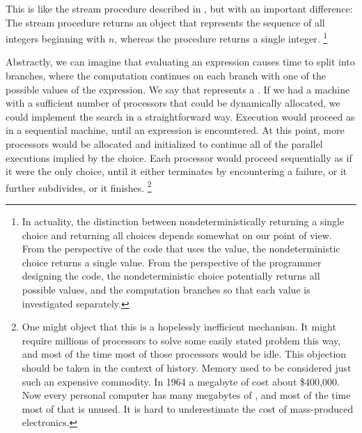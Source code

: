 This is like the stream procedure  described in , but with an important difference:
The stream procedure returns an object that represents the sequence of all integers beginning with \( n \), whereas the  procedure returns a single integer.%
\footnote{
	In actuality, the distinction between nondeterministically returning a single choice and returning all choices depends somewhat on our point of view.
	From the perspective of the code that uses the value, the nondeterministic choice returns a single value.
	From the perspective of the programmer designing the code, the nondeterministic choice potentially returns all possible values, and the computation branches so that each value is investigated separately.
}

Abstractly, we can imagine that evaluating an  expression causes time to split into branches, where the computation continues on each branch with one of the possible values of the expression.
We say that  represents a .
If we had a machine with a sufficient number of processors that could be dynamically allocated, we could implement the search in a straightforward way.
Execution would proceed as in a sequential machine, until an  expression is encountered.
At this point, more processors would be allocated and initialized to continue all of the parallel executions implied by the choice.
Each processor would proceed sequentially as if it were the only choice, until it either terminates by encountering a failure, or it further subdivides, or it finishes.%
\footnote{
	One might object that this is a hopelessly inefficient mechanism.
	It might require millions of processors to solve some easily stated problem this way, and most of the time most of those processors would be idle.
	This objection should be taken in the context of history.
	Memory used to be considered just such an expensive commodity.
	In 1964 a megabyte of  cost about \$400,000.
	Now every personal computer has many megabytes of , and most of the time most of that  is unused.
	It is hard to underestimate the cost of mass-produced electronics.
}

